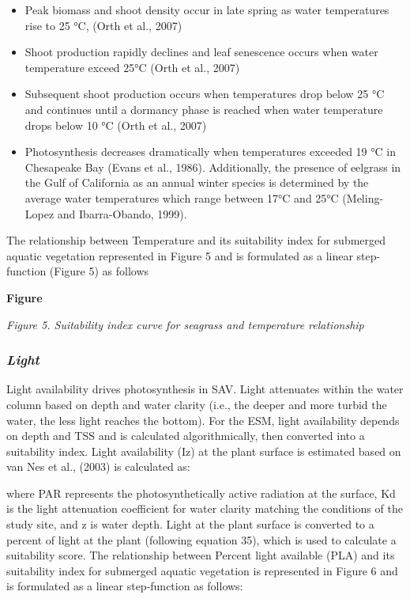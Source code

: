 \documentclass[
]{book}
\begin{document}
\begin{itemize}
\item
  Peak biomass and shoot density occur in late spring as water temperatures rise to 25 °C, (Orth et al., 2007)
\item
  Shoot production rapidly declines and leaf senescence occurs when water temperature exceed 25°C (Orth et al., 2007)
\item
  Subsequent shoot production occurs when temperatures drop below 25 °C and continues until a dormancy phase is reached when water temperature drops below 10 °C (Orth et al., 2007)
\item
  Photosynthesis decreases dramatically when temperatures exceeded 19 °C in Chesapeake Bay (Evans et al., 1986). Additionally, the presence of eelgrass in the Gulf of California as an annual winter species is determined by the average water temperatures which range between 17°C and 25°C (Meling-Lopez and Ibarra-Obando, 1999).
\end{itemize}

The relationship between Temperature and its suitability index for submerged aquatic vegetation represented in Figure 5 and is formulated as a linear step-function (Figure 5) as follows

\textbf{Figure}

\emph{Figure 5. Suitability index curve for seagrass and temperature relationship}

\hypertarget{light}{%
\subsubsection{\texorpdfstring{\emph{Light}}{Light}}\label{light}}

Light availability drives photosynthesis in SAV. Light attenuates within the water column based on depth and water clarity (i.e., the deeper and more turbid the water, the less light reaches the bottom). For the ESM, light availability depends on depth and TSS and is calculated algorithmically, then converted into a suitability index. Light availability (Iz) at the plant surface is estimated based on van Nes et al., (2003) is calculated as:

where PAR represents the photosynthetically active radiation at the surface, Kd is the light attenuation coefficient for water clarity matching the conditions of the study site, and z is water depth. Light at the plant surface is converted to a percent of light at the plant (following equation 35), which is used to calculate a suitability score. The relationship between Percent light available (PLA) and its suitability index for submerged aquatic vegetation is represented in Figure 6 and is formulated as a linear step-function as follows:
\end{document}
